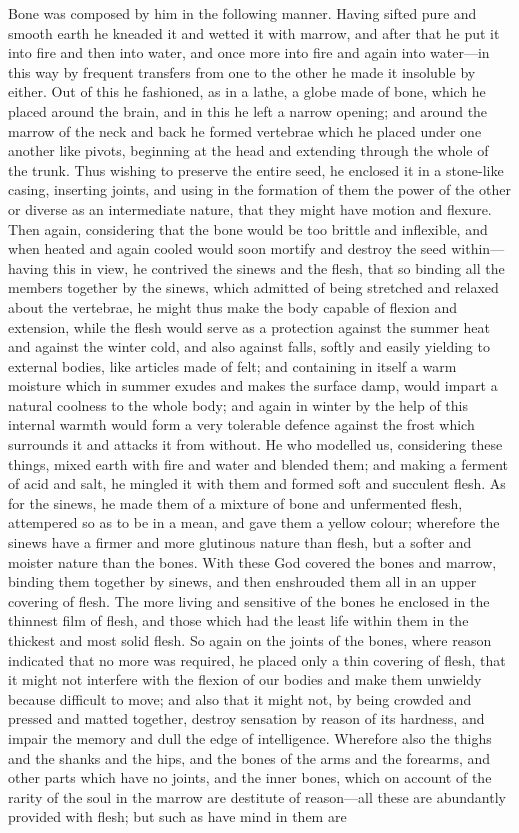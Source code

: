 \documentclass[11pt,letter]{article}
\begin{document}
\par  Bone was composed by him in the following manner. Having sifted pure and smooth earth he kneaded it and wetted it with marrow, and after that he put it into fire and then into water, and once more into fire and again into water—in this way by frequent transfers from one to the other he made it insoluble by either. Out of this he fashioned, as in a lathe, a globe made of bone, which he placed around the brain, and in this he left a narrow opening; and around the marrow of the neck and back he formed vertebrae which he placed under one another like pivots, beginning at the head and extending through the whole of the trunk. Thus wishing to preserve the entire seed, he enclosed it in a stone-like casing, inserting joints, and using in the formation of them the power of the other or diverse as an intermediate nature, that they might have motion and flexure. Then again, considering that the bone would be too brittle and inflexible, and when heated and again cooled would soon mortify and destroy the seed within—having this in view, he contrived the sinews and the flesh, that so binding all the members together by the sinews, which admitted of being stretched and relaxed about the vertebrae, he might thus make the body capable of flexion and extension, while the flesh would serve as a protection against the summer heat and against the winter cold, and also against falls, softly and easily yielding to external bodies, like articles made of felt; and containing in itself a warm moisture which in summer exudes and makes the surface damp, would impart a natural coolness to the whole body; and again in winter by the help of this internal warmth would form a very tolerable defence against the frost which surrounds it and attacks it from without. He who modelled us, considering these things, mixed earth with fire and water and blended them; and making a ferment of acid and salt, he mingled it with them and formed soft and succulent flesh. As for the sinews, he made them of a mixture of bone and unfermented flesh, attempered so as to be in a mean, and gave them a yellow colour; wherefore the sinews have a firmer and more glutinous nature than flesh, but a softer and moister nature than the bones. With these God covered the bones and marrow, binding them together by sinews, and then enshrouded them all in an upper covering of flesh. The more living and sensitive of the bones he enclosed in the thinnest film of flesh, and those which had the least life within them in the thickest and most solid flesh. So again on the joints of the bones, where reason indicated that no more was required, he placed only a thin covering of flesh, that it might not interfere with the flexion of our bodies and make them unwieldy because difficult to move; and also that it might not, by being crowded and pressed and matted together, destroy sensation by reason of its hardness, and impair the memory and dull the edge of intelligence. Wherefore also the thighs and the shanks and the hips, and the bones of the arms and the forearms, and other parts which have no joints, and the inner bones, which on account of the rarity of the soul in the marrow are destitute of reason—all these are abundantly provided with flesh; but such as have mind in them are 
\end{document}
